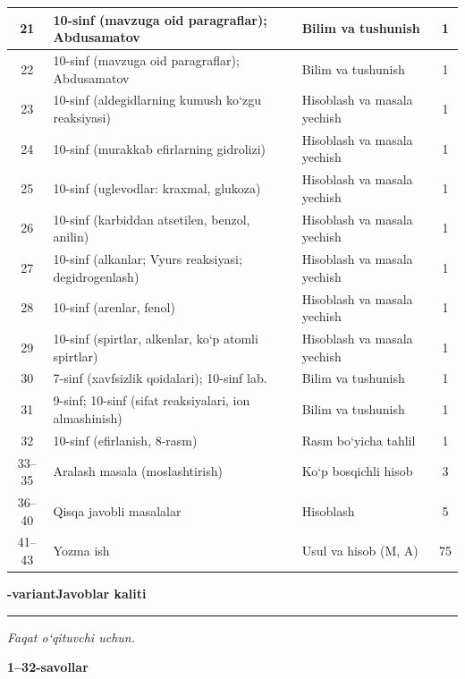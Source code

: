 \documentclass[11pt,a4paper]{article}
\newcommand{\hdrpill}[1]{\begin{tikzpicture}[baseline=0pt]\node[fill=ygreen,text=white,rounded corners=8pt,inner xsep=10pt,inner ysep=5pt,font=\fontsize{13}{15}\bfseries\selectfont] at (0,0.475){#1};\end{tikzpicture}}
\newcommand{\curvar}{}\fancyhead[R]{\hdrpill{\curvar}}
\begin{document}
{\begin{longtable}{|c|p{7.2cm}|p{5.4cm}|c|}
21 & 10-sinf (mavzuga oid paragraflar); Abdusamatov & Bilim va tushunish & 1\\\hline
22 & 10-sinf (mavzuga oid paragraflar); Abdusamatov & Bilim va tushunish & 1\\\hline
23 & 10-sinf (aldegidlarning kumush ko`zgu reaksiyasi) & Hisoblash va masala yechish & 1\\\hline
24 & 10-sinf (murakkab efirlarning gidrolizi) & Hisoblash va masala yechish & 1\\\hline
25 & 10-sinf (uglevodlar: kraxmal, glukoza) & Hisoblash va masala yechish & 1\\\hline
26 & 10-sinf (karbiddan atsetilen, benzol, anilin) & Hisoblash va masala yechish & 1\\\hline
27 & 10-sinf (alkanlar; Vyurs reaksiyasi; degidrogenlash) & Hisoblash va masala yechish & 1\\\hline
28 & 10-sinf (arenlar, fenol) & Hisoblash va masala yechish & 1\\\hline
29 & 10-sinf (spirtlar, alkenlar, ko`p atomli spirtlar) & Hisoblash va masala yechish & 1\\\hline
30 & 7-sinf (xavfsizlik qoidalari); 10-sinf lab. & Bilim va tushunish & 1\\\hline
31 & 9-sinf; 10-sinf (sifat reaksiyalari, ion almashinish) & Bilim va tushunish & 1\\\hline
32 & 10-sinf (efirlanish, 8-rasm) & Rasm bo`yicha tahlil & 1\\\hline
33--35 & Aralash masala (moslashtirish) & Ko`p bosqichli hisob & 3\\\hline
36--40 & Qisqa javobli masalalar & Hisoblash & 5\\\hline
41--43 & Yozma ish & Usul va hisob (M, A) & 75\\\hline
\end{longtable}}
\renewcommand{\curvar}{Javoblar}
\newpage
\noindent\textbf{\fontsize{13}{15}-variant}\hfill \textbf{Javoblar kaliti}\par\smallskip\hrule\smallskip
\textit{Faqat o`qituvchi uchun.}\par\medskip
\noindent\textbf{1--32-savollar}\par\smallskip
\end{document}

